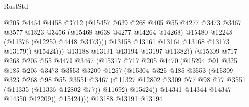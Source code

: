 \begin{lexlean}{RustStd}
\begin{coremodule}
{\begin{coremodule}
{{{{{{{{{{{{{{{{{{{{{{{{{{{{{{{{{{{{{{{{{{{{{{{{{{{{{{{{{{{{{{{{{{{{{{{{{{{{{{{{{{{{{                              @205
                              @4454
                              @4458
                              @3712
                              (@15457
                                @639
                                @268
                                @405
                                @55
                                @4277
                                @3473
                                @3467
                                @3577
                                @1823
                                @3456
                                (@15468 @638 @4277 @14264 @14268)
                                @15480
                                @12248
                                (@11376 (@12250 @4448 @3473)))
                              @13158
                              @13161
                              @13164
                              @13168
                              @13173
                              @13179))
                          @15424)))
                    @13188
                    @13191
                    @13194
                    @13197
                    @11382))
                (@15309
                  @717
                  @268
                  @205
                  @55
                  @4470
                  @3467
                  (@15317
                    @717
                    @205
                    @4470
                    (@15294
                      @91
                      @325
                      @185
                      @205
                      @3473
                      @3553
                      @3209
                      @1257
                      (@15304
                        @325
                        @185
                        @3553
                        (@15309
                          @323
                          @268
                          @98
                          @55
                          @3551
                          @3467
                          (@11327
                            @12802
                            @3309
                            @77
                            @98
                            @77
                            @3551
                            (@11335 (@11336 @12802 @77))
                            @11692)
                          @15424))
                      @14341
                      @14344
                      @14347
                      @14350
                      @12209))
                  @15424)))
            @13188
            @13191
            @13194
}}}}}}}}}}}}}}}}}}}}}}}}}}}}}}}}}}}}}}}}}}}}}}}}}}}}}}}}}}}}}}}}}}}}}}}}}}}}}}}}}}}}}
\end{coremodule}}
\end{coremodule}
\end{lexlean}

